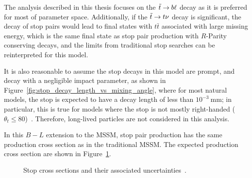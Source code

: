 The analysis described in this thesis focuses on the $\tilde{t} \rightarrow b\ell$ decay
as it is preferred for most of parameter space.
Additionally, if the $\tilde{t} \rightarrow t\nu$ decay is significant, the decay of stop
pairs would lead to final states with $t\bar{t}$ associated with large missing
energy, which is the same final state as stop pair production with
$R$-Parity conserving decays, and the limits from traditional stop searches can
be reinterpreted for this model.

It is also reasonable to assume the stop decays in this model are prompt, and
decay with a negligible impact parameter, as shown in
Figure~\ref{fig:stop_decay_length_vs_mixing_angle}, where for most natural
models, the stop is expected to have a decay length of less than
$10^{-3}~\mathrm{mm}$;
in particular, this is true for models where the stop is not mostly
right-handed ($\theta_t \leq 80$)~\cite{Marshall:2014cwa,Marshall:2014kea}.
Therefore, long-lived particles are not considered in this analysis.

In this $B-L$ extension to the MSSM, stop pair production has the same
production cross section as in the traditional MSSM.
The expected production cross section are shown in Figure~\ref{fig:stop_xsec}.

\begin{figure}[ht]
  \caption{Stop cross sections and their associated
    uncertainties~\cite{Beenakker:1997ut,Beenakker:2010nq,Beenakker:2011fu}.
  }
  \label{fig:stop_xsec}
\end{figure}

\FloatBarrier

